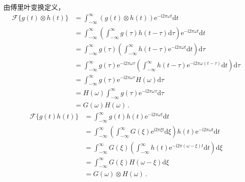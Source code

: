 \begin{prove}
    由傅里叶变换定义，
    \begin{align}
        \mathcal{F}\{g(t)\otimes h(t)\} & =\int_{-\infty}^{\infty}(g(t)\otimes h(t))\mathrm{e}^{-\mathrm{i}2\pi\omega t}\mathrm{d}t\nonumber                                                                                              \\
                                        & =\int_{-\infty}^{\infty}\left(\int_{-\infty}^{\infty}g(\tau)h(t-\tau)\mathrm{d}\tau\right)\mathrm{e}^{-\mathrm{i}2\pi\omega t}\mathrm{d}t\nonumber                                              \\
                                        & =\int_{-\infty}^{\infty}g(\tau)\left(\int_{-\infty}^{\infty}h(t-\tau)\mathrm{e}^{-\mathrm{i}2\pi\omega t}\mathrm{d}t\right)\mathrm{d}\tau\nonumber                                              \\
                                        & =\int_{-\infty}^{\infty}g(\tau)\mathrm{e}^{-\mathrm{i}2\pi\omega\tau}\left(\int_{-\infty}^{\infty}h(t-\tau)\mathrm{e}^{-\mathrm{i}2\pi\omega (t-\tau)}\mathrm{d}t\right)\mathrm{d}\tau\nonumber \\
                                        & =\int_{-\infty}^{\infty}g(\tau)\mathrm{e}^{-\mathrm{i}2\pi\omega\tau}H(\omega)\mathrm{d}\tau\nonumber                                                                                           \\
                                        & =H(\omega)\int_{-\infty}^{\infty}g(\tau)\mathrm{e}^{-\mathrm{i}2\pi\omega\tau}\mathrm{d}\tau\nonumber                                                                                           \\
                                        & =G(\omega)H(\omega)\, .
    \end{align}
    \begin{align}
        \mathcal{F}\{g(t)h(t)\} & =\int_{-\infty}^{\infty}g(t)h(t)\mathrm{e}^{-\mathrm{i}2\pi\omega t}\mathrm{d}t\nonumber                                                                                    \\
                                & =\int_{-\infty}^{\infty}\left(\int_{-\infty}^{\infty}G(\xi)\mathrm{e}^{\mathrm{i}2\pi\xi t}\mathrm{d}\xi\right)h(t)\mathrm{e}^{-\mathrm{i}2\pi\omega t}\mathrm{d}t\nonumber \\
                                & =\int_{-\infty}^{\infty}G(\xi)\left(\int_{-\infty}^{\infty}h(t)\mathrm{e}^{-\mathrm{i}2\pi(\omega-\xi)t}\mathrm{d}t\right)\mathrm{d}\xi\nonumber                            \\
                                & =\int_{-\infty}^{\infty}G(\xi)H(\omega-\xi)\mathrm{d}\xi\nonumber                                                                                                           \\
                                & =G(\omega)\otimes H(\omega)\, .
    \end{align}
\end{prove}

